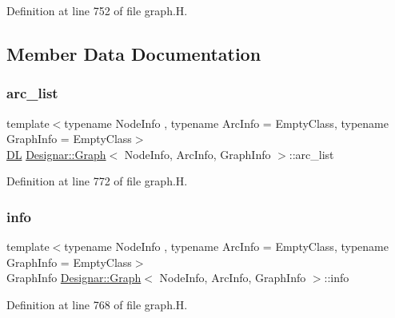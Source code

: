 Definition at line 752 of file graph.\+H.



\subsection{Member Data Documentation}
\mbox{\label{class_designar_1_1_graph_a8c809db7848c78f6718aad466ee959b2}} 
\subsubsection{\texorpdfstring{arc\+\_\+list}{arc\_list}}
{\footnotesize\ttfamily template$<$typename Node\+Info , typename Arc\+Info  = Empty\+Class, typename Graph\+Info  = Empty\+Class$>$ \\
\hyperlink{class_designar_1_1_d_l}{DL} \hyperlink{class_designar_1_1_graph}{Designar\+::\+Graph}$<$ Node\+Info, Arc\+Info, Graph\+Info $>$\+::arc\+\_\+list\hspace{0.3cm}{\ttfamily [protected]}}



Definition at line 772 of file graph.\+H.

\mbox{\label{class_designar_1_1_graph_a2a8b41ce641ad2fb1b84a4d6b024bb1a}} 
\subsubsection{\texorpdfstring{info}{info}}
{\footnotesize\ttfamily template$<$typename Node\+Info , typename Arc\+Info  = Empty\+Class, typename Graph\+Info  = Empty\+Class$>$ \\
Graph\+Info \hyperlink{class_designar_1_1_graph}{Designar\+::\+Graph}$<$ Node\+Info, Arc\+Info, Graph\+Info $>$\+::info\hspace{0.3cm}{\ttfamily [protected]}}



Definition at line 768 of file graph.\+H.

\mbox{\label{class_designar_1_1_graph_a31b0117b6d87816f703a4a5baa1fa6ce}} 
